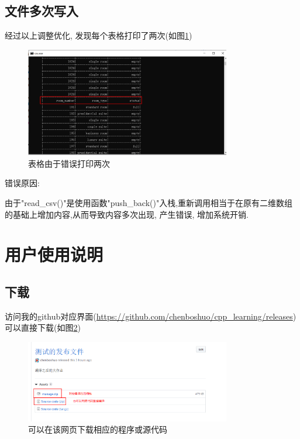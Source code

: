 \documentclass[UTF8]{ctexart}
\begin{document}
  \subsection{文件多次写入}
    经过以上调整优化, 发现每个表格打印了两次(如图\ref{fig:bug_3})
    \begin{figure}[H]
      \centering
      \includegraphics[width=0.8\textwidth]{bug_3}
      \caption{表格由于错误打印两次}
      \label{fig:bug_3}
    \end{figure}

    错误原因:

    由于"read\_csv()"是使用函数"push\_back()"入栈,重新调用相当于在原有二维数组的基础上增加内容,从而导致内容多次出现, 产生错误, 增加系统开销.


\section{用户使用说明}
  \subsection{下载}
    访问我的github对应界面(\url{https://github.com/chenboshuo/cpp_learning/releases})可以直接下载(如图\ref{fig:d_1})
    \begin{figure}[H]
      \centering
      \includegraphics[width=0.8\textwidth]{d_1}
      \caption{可以在该网页下载相应的程序或源代码}
      \label{fig:d_1}
    \end{figure}
\end{document}

